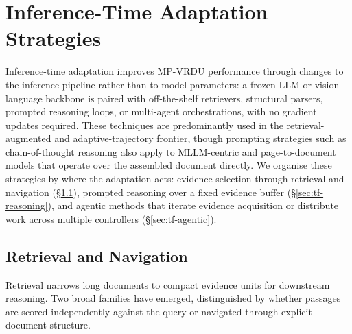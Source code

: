 \documentclass[11pt]{article}
\begin{document}
\section{Inference-Time Adaptation Strategies}
\label{sec:inference-time}
Inference-time adaptation improves MP-VRDU performance through changes to the inference pipeline rather than to model parameters: a frozen LLM or vision-language backbone is paired with off-the-shelf retrievers, structural parsers, prompted reasoning loops, or multi-agent orchestrations, with no gradient updates required. These techniques are predominantly used in the retrieval-augmented and adaptive-trajectory frontier, though prompting strategies such as chain-of-thought reasoning also apply to MLLM-centric and page-to-document models that operate over the assembled document directly. We organise these strategies by where the adaptation acts: evidence selection through retrieval and navigation (\S\ref{sec:tf-retrieval}), prompted reasoning over a fixed evidence buffer (\S\ref{sec:tf-reasoning}), and agentic methods that iterate evidence acquisition or distribute work across multiple controllers (\S\ref{sec:tf-agentic}).

\subsection{Retrieval and Navigation} \label{sec:tf-retrieval}

Retrieval narrows long documents to compact evidence units for downstream reasoning. Two broad families have emerged, distinguished by whether passages are scored independently against the query or navigated through explicit document structure.
\end{document}
